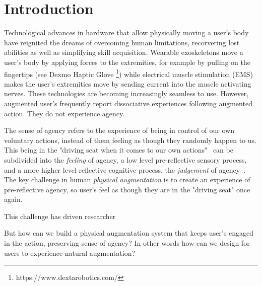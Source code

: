 \section{Introduction}
Technological advances in hardware that allow physically moving a user's body have reignited the dreams of overcoming human limitations, recorvering lost abilities as well as simplifying skill acquisition. Wearable exoskeletons move a user's body by applying forces to the extremities, for example by pulling on the fingertips (see Dexmo Haptic Glove \footnote{https://www.dextarobotics.com/}) while electrical muscle stimulation (EMS) makes the user's extremities move by sending current into the muscle activating nerves. These technologies are becoming increasingly seamless to use. However, augmented user's frequently report dissociative experiences following augmented action. They do not experience agency. 

The sense of agency refers to the experience of being in control of our own voluntary actions, instead of them feeling as though they randomly happen to us. This being in the "driving seat when it comes to our own actions"~\cite{Moore2016-ubd} can be subdivided into the \textit{feeling} of agency, a low level pre-reflective sensory process, and a more higher level reflective cognitive process, the \textit{judgement} of agency~\cite{Moore2016-ub, Danry2022-xk}. The key challenge in human \textit{physical augmentation} is to create an experience of pre-reflective agency, so user's feel as though they are in the "driving seat" once again.

This challenge has driven researcher

But how can we build a physical augmentation system that keeps user's engaged in the action, preserving sense of agency? In other words how can we design for users to experience natural augmentation?


